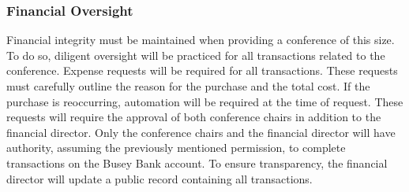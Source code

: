 \subsubsection{Financial Oversight}
Financial integrity must be maintained when providing a conference of this size. To do so, diligent oversight will be practiced for all transactions related to the conference. Expense requests will be required for all transactions. These requests must carefully outline the reason for the purchase and the total cost. If the purchase is reoccurring, automation will be required at the time of request. These requests will require the approval of both conference chairs in addition to the financial director. Only the conference chairs and the financial director will have authority, assuming the previously mentioned permission, to complete transactions on the Busey Bank account. To ensure transparency, the financial director will update a public record containing all transactions. 
